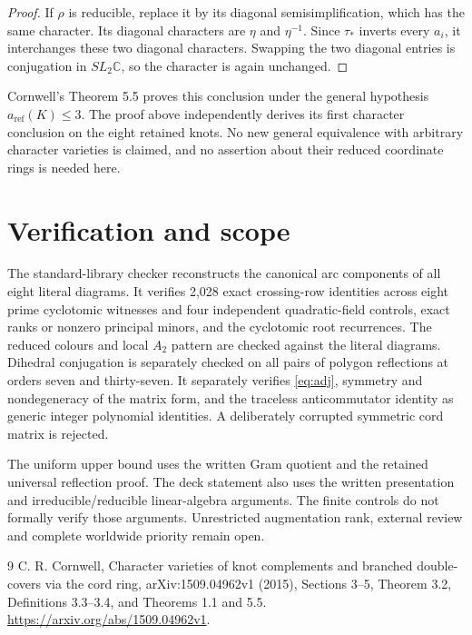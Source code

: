 \documentclass[11pt]{article}
\newcommand{\C}{\mathbb C}
\begin{document}
\begin{proof}
If $\rho$ is reducible, replace it by its diagonal semisimplification,
which has the same character. Its diagonal characters are $\eta$
and $\eta^{-1}$. Since $\tau_*$ inverts every $a_i$, it interchanges
these two diagonal characters. Swapping the two diagonal entries is
conjugation in $SL_2\C$, so the character is again unchanged.
\end{proof}

Cornwell's Theorem 5.5 proves this conclusion under the general
hypothesis $a_{\mathrm{ref}}(K)\le3$. The proof above independently
derives its first character conclusion on the eight retained knots.
No new general equivalence with arbitrary character varieties is
claimed, and no assertion about their reduced coordinate rings is
needed here.

\section{Verification and scope}

The standard-library checker reconstructs the canonical arc components
of all eight literal diagrams. It verifies 2,028 exact crossing-row identities across eight prime
cyclotomic witnesses and four independent quadratic-field controls,
exact ranks or nonzero principal minors, and the cyclotomic root
recurrences. The reduced colours and local $A_2$ pattern are checked
against the literal diagrams. Dihedral conjugation is separately
checked on all pairs of polygon reflections at orders seven and
thirty-seven.
It separately verifies \eqref{eq:adj}, symmetry and nondegeneracy of
the matrix form, and the traceless anticommutator identity as generic
integer polynomial identities. A deliberately corrupted symmetric
cord matrix is rejected.

The uniform upper bound uses the written Gram quotient and the
retained universal reflection proof. The deck statement also uses
the written presentation and irreducible/reducible linear-algebra
arguments. The finite controls do not formally verify those arguments.
Unrestricted augmentation rank, external review and complete
worldwide priority remain open.

\begin{thebibliography}{9}
 C. R. Cornwell,
Character varieties of knot complements and branched double-covers
via the cord ring, arXiv:1509.04962v1 (2015), Sections 3--5,
Theorem 3.2, Definitions 3.3--3.4, and Theorems 1.1 and 5.5.
\url{https://arxiv.org/abs/1509.04962v1}.
\end{thebibliography}
\end{document}

